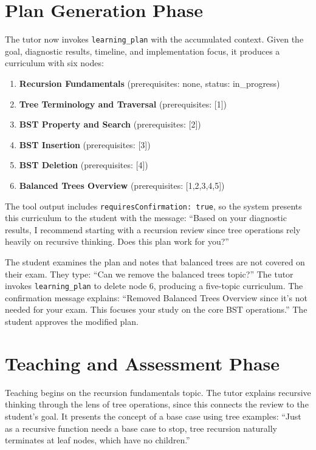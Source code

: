 \documentclass[logo,bsc,singlespacing,parskip,online]{infthesis}
\begin{document}
\section{Plan Generation Phase}

The tutor now invokes \texttt{learning\_plan} with the accumulated context. Given the goal, diagnostic results, timeline, and implementation focus, it produces a curriculum with six nodes:

\begin{enumerate}
\item \textbf{Recursion Fundamentals} (prerequisites: none, status: in\_progress)
\item \textbf{Tree Terminology and Traversal} (prerequisites: [1])
\item \textbf{BST Property and Search} (prerequisites: [2])
\item \textbf{BST Insertion} (prerequisites: [3])
\item \textbf{BST Deletion} (prerequisites: [4])
\item \textbf{Balanced Trees Overview} (prerequisites: [1,2,3,4,5])
\end{enumerate}

The tool output includes \texttt{requiresConfirmation: true}, so the system presents this curriculum to the student with the message: ``Based on your diagnostic results, I recommend starting with a recursion review since tree operations rely heavily on recursive thinking. Does this plan work for you?''

The student examines the plan and notes that balanced trees are not covered on their exam. They type: ``Can we remove the balanced trees topic?'' The tutor invokes \texttt{learning\_plan} to delete node 6, producing a five-topic curriculum. The confirmation message explains: ``Removed Balanced Trees Overview since it's not needed for your exam. This focuses your study on the core BST operations.'' The student approves the modified plan.

\section{Teaching and Assessment Phase}

Teaching begins on the recursion fundamentals topic. The tutor explains recursive thinking through the lens of tree operations, since this connects the review to the student's goal. It presents the concept of a base case using tree examples: ``Just as a recursive function needs a base case to stop, tree recursion naturally terminates at leaf nodes, which have no children.''
\end{document}
